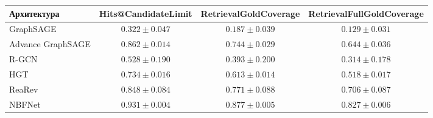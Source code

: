 \begin{tabular}{lccc}
\toprule
Архитектура & Hits@CandidateLimit & RetrievalGoldCoverage & RetrievalFullGoldCoverage \\
\midrule
GraphSAGE & $0.322 \pm 0.047$ & $0.187 \pm 0.039$ & $0.129 \pm 0.031$ \\
Advance GraphSAGE & $0.862 \pm 0.014$ & $0.744 \pm 0.029$ & $0.644 \pm 0.036$ \\
R-GCN & $0.528 \pm 0.190$ & $0.393 \pm 0.200$ & $0.314 \pm 0.178$ \\
HGT & $0.734 \pm 0.016$ & $0.613 \pm 0.014$ & $0.518 \pm 0.017$ \\
ReaRev & $0.848 \pm 0.084$ & $0.771 \pm 0.088$ & $0.706 \pm 0.087$ \\
NBFNet & $0.931 \pm 0.004$ & $0.877 \pm 0.005$ & $0.827 \pm 0.006$ \\
\bottomrule
\end{tabular}
